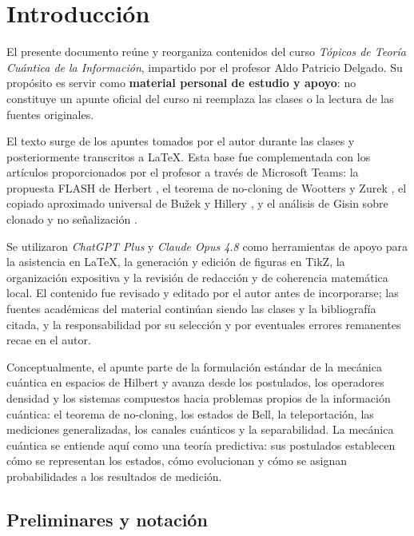 \documentclass[../main.tex]{subfiles}
\begin{document}
\chapter*{Introducción}

El presente documento reúne y reorganiza contenidos del curso \emph{Tópicos de Teoría Cuántica de la Información}, impartido por el profesor Aldo Patricio Delgado. Su propósito es servir como \textbf{material personal de estudio y apoyo}: no constituye un apunte oficial del curso ni reemplaza las clases o la lectura de las fuentes originales.

El texto surge de los apuntes tomados por el autor durante las clases y posteriormente transcritos a \LaTeX. Esta base fue complementada con los artículos proporcionados por el profesor a través de Microsoft Teams: la propuesta FLASH de Herbert \cite{HerbertFLASH}, el teorema de no-cloning de Wootters y Zurek \cite{WoottersZurek1982}, el copiado aproximado universal de Bu\v{z}ek y Hillery \cite{BuzekHillery1996}, y el análisis de Gisin sobre clonado y no señalización \cite{Gisin1998}.

Se utilizaron \emph{ChatGPT Plus} y \emph{Claude Opus 4.8} como herramientas de apoyo para la asistencia en \LaTeX, la generación y edición de figuras en TikZ, la organización expositiva y la revisión de redacción y de coherencia matemática local. El contenido fue revisado y editado por el autor antes de incorporarse; las fuentes académicas del material continúan siendo las clases y la bibliografía citada, y la responsabilidad por su selección y por eventuales errores remanentes recae en el autor.

Conceptualmente, el apunte parte de la formulación estándar de la mecánica cuántica en espacios de Hilbert y avanza desde los postulados, los operadores densidad y los sistemas compuestos hacia problemas propios de la información cuántica: el teorema de no-cloning, los estados de Bell, la teleportación, las mediciones generalizadas, los canales cuánticos y la separabilidad. La mecánica cuántica se entiende aquí como una teoría predictiva: sus postulados establecen cómo se representan los estados, cómo evolucionan y cómo se asignan probabilidades a los resultados de medición.


\section*{Preliminares y notación}
\end{document}
